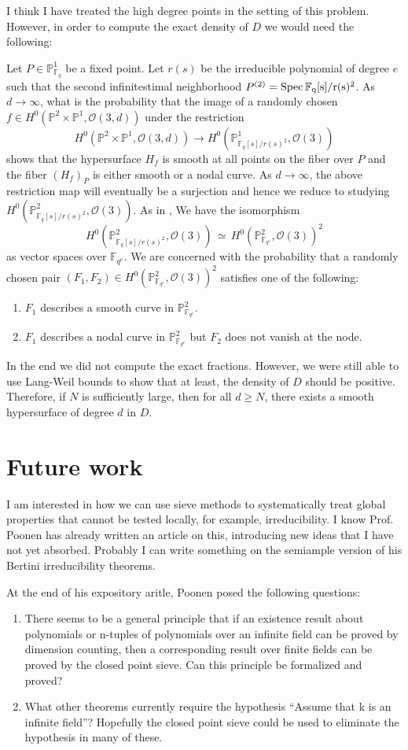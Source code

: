 \documentclass[12pt]{article}
\theoremstyle{plain}
\theoremstyle{definition}
\newcommand{\IF}{\mathbb{F}}
\newcommand{\IP}{\mathbb{P}}
\newcommand{\sO}{\mathcal{O}}
\newcommand{\Spec}{\rm Spec\,}
\newcommand\iso{{\, \simeq \,}}
\newcommand{\<}{\langle}
\renewcommand{\>}{\rangle}
\begin{document}
I think I have treated the high degree points in the setting of this problem. However, in order to compute the exact density of $D$ we would need the following:

Let $P \in \IP^1_{\IF_q}$ be a fixed point. Let $r(s)$ be the irreducible polynomial of degree $e$ such that the second infinitestimal neighborhood $P^{(2)} = \Spec \IF_q[s]/r(s)^2$. As $d \to \infty$, what is the probability that the image of a randomly chosen $f \in H^0(\IP^2 \times \IP^1, \sO(3, d))$ under the restriction 
$$ H^0(\IP^2 \times \IP^1, \sO(3, d)) \to H^0(\IP^1_{\IF_q[s]/r(s)^2}, \sO(3))$$
shows that the hypersurface $H_f$ is smooth at all points on the fiber over $P$ and the fiber $(H_f)_P$ is either smooth or a nodal curve. As $d \to \infty$, the above restriction map will eventually be a surjection and hence we reduce to studying $H^0(\IP^2_{\IF_q[s]/r(s)^2}, \sO(3))$. As in \cite{Wood}, We have the isomorphism 
$$ H^0(\IP^2_{\IF_q[s]/r(s)^2}, \sO(3)) \iso H^0(\IP^2_{\IF_{q^e}}, \sO(3))^2 $$
as vector spaces over $\IF_{q^e}$. We are concerned with the probability that a randomly chosen pair $(F_1, F_2) \in H^0(\IP^2_{\IF_{q^e}}, \sO(3))^2$ satisfies one of the following:
\begin{enumerate}
\item $F_1$ describes a smooth curve in $\IP^2_{\IF_{q^e}}$. 
\item $F_1$ describes a nodal curve in $\IP^2_{\IF_{q^e}}$ but $F_2$ does not vanish at the node. 
\end{enumerate}

In the end we did not compute the exact fractions. However, we were still able to use Lang-Weil bounds to show that at least, the density of $D$ should be positive. Therefore, if $N$ is sufficiently large, then for all $d \ge N$, there exists a smooth hypersurface of degree $d$ in $D$. 

\section{Future work}
I am interested in how we can use sieve methods to systematically treat global properties that cannot be tested locally, for example, irreducibility. I know Prof. Poonen has already written an article on this, introducing new ideas that I have not yet absorbed. Probably I can write something on the semiample version of his Bertini irreducibility theorems.

At the end of his expository aritle, Poonen posed the following questions:
\begin{enumerate}
\item There seems to be a general principle that if an existence result about polynomials
or n-tuples of polynomials over an infinite field can be proved by dimension counting,
then a corresponding result over finite fields can be proved by the closed point sieve.
Can this principle be formalized and proved?

\item What other theorems currently require the hypothesis “Assume that k is an infinite
field”? Hopefully the closed point sieve could be used to eliminate the hypothesis in
many of these.
\end{enumerate}
\end{document}
